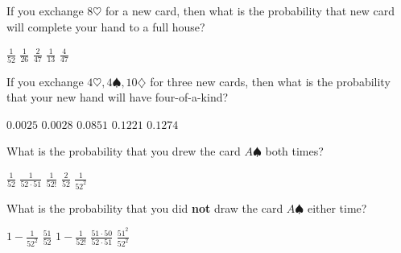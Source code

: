 \documentclass[answers,12pt]{exam}
\begin{document}
\begin{questions}

\question\label{FirstPoker} 
If you exchange $8\heartsuit$ for a new card,
then what is the probability that new card
will complete your hand to a full house?\\
\begin{oneparchoices}
\choice $\frac{1}{52}$
\choice $\frac{1}{26}$ %
\choice $\frac{2}{47}$ %
\choice $\frac{1}{13}$ %
\correctchoice $\frac{4}{47}$
\end{oneparchoices}

\question\label{LastPoker}
If you exchange $4\heartsuit,4\spadesuit,10\diamondsuit$ for three
new cards, then what is the probability that your new hand
will have four-of-a-kind?\\
\begin{oneparchoices}
\choice $0.0025$ %
\correctchoice $0.0028$
\choice $0.0851$ %
\choice $0.1221$ %
\choice $0.1274$ %
\end{oneparchoices}


\question\label{FirstDeck} What is the probability that you
drew the card $A\spadesuit$ both times?\\
\begin{oneparchoices}
\choice $\frac{1}{52}$
\choice $\frac{1}{52\cdot 51}$
\choice $\frac{1}{52!}$
\choice $\frac{2}{52}$
\correctchoice $\frac{1}{52^2}$
\end{oneparchoices}

\question\label{LastDeck} What is the probability that you
did {\bf not} draw the card $A\spadesuit$ either time?\\
\begin{oneparchoices}
\choice $1-\frac{1}{52^2}$
\choice $\frac{51}{52}$
\choice $1-\frac{1}{52!}$
\choice $\frac{51\cdot 50}{52\cdot 51}$
\correctchoice $\frac{51^2}{52^2}$
\end{oneparchoices}



\end{questions}
\end{document}
